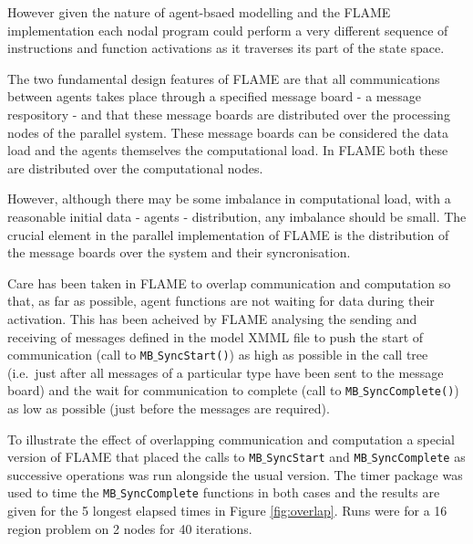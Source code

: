However given the nature of agent-bsaed modelling and the FLAME implementation each nodal program could perform a very different sequence of instructions and function activations as it traverses its part of the state space. 

The two fundamental design features of FLAME are that all communications between agents takes place through a specified message board - a message respository - and that these message boards are distributed over the processing nodes of the parallel system. These message boards can be considered the data load and the agents themselves the computational load. In FLAME both these are distributed over the computational nodes.

However, although there may be some imbalance in computational load, with a reasonable initial data - agents - distribution, any imbalance should be small. The crucial element in the parallel implementation of FLAME is the distribution of the message boards over the system and their syncronisation.

Care has been taken in FLAME to overlap communication and computation so that, as far as possible, agent functions are not waiting for data during their activation. This has been acheived by FLAME analysing the sending and receiving of messages defined in the model XMML file to push the start of communication (call to \texttt{MB$\_$SyncStart()}) as high as possible in the call tree (i.e.\ just after all messages of a particular type have been sent to the message board) and the wait for communication to complete (call to \texttt{MB$\_$SyncComplete()}) as low as possible (just before the messages are required).

To illustrate the effect of overlapping communication and computation a special version of FLAME that placed the calls to  \texttt{MB$\_$SyncStart} and \texttt{MB$\_$SyncComplete} as successive operations was run alongside the usual version. The timer package was used to time the \texttt{MB$\_$SyncComplete} functions in both cases and the results are given for the 5 longest elapsed times in Figure \ref{fig:overlap}. Runs were for a 16 region problem on 2 nodes for 40 iterations. 

